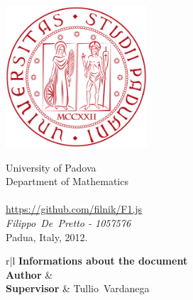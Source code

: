 \documentclass[a4paper,11pt]{article}
\def\ME				{\mbox{Filippo De Pretto}}
\def\SERIAL			{\mbox{1057576}}
\def\SUPERVISOR		{\mbox{Tullio Vardanega}}
\def\END			{Padua, Italy, 2012.}
\begin{document}
		
\thispagestyle{empty}

\begin{center}

\includegraphics[height=200px]{img/unipd_logo.png}

\vspace{0.5cm}
{\Huge University of Padova}\\[.5pc]
{\Large Department of Mathematics}\\[.5pc]
\vspace{5 mm}
{\Huge \textbf{\PROJECT{}}}\\[.5pc]
{\Large \url{https://github.com/filnik/F1.js}}\\[.5pc]
{\Large \emph{\ME{} - \SERIAL{}}}\\[1pc]


\vspace{0.5cm}
{\Large \END}\\[3pc]

\normalsize{
	\begin{tabular}{r|l}
		 {\textbf{Informations about the document}} \\
		\midrule
		\textbf{Author} 				& \AUTHOR \\
		\textbf{Supervisor} 			& \SUPERVISOR \\
	\end{tabular}
}

\end{center}

\newpage
\end{document}
